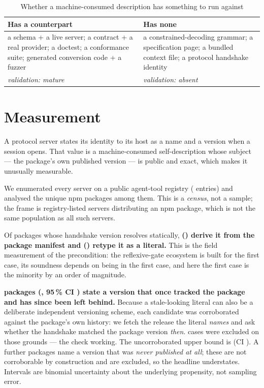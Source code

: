 \documentclass[10pt,conference]{IEEEtran}
\begin{document}
\begin{table}[t]
\caption{Whether a machine-consumed description has something to run against}
\label{tab:counterpart}
\centering\footnotesize
\begin{tabular}{@{}p{}p{}@{}}
\toprule
\textbf{Has a counterpart} & \textbf{Has none} \\
\midrule
a schema + a live server; a contract + a real provider; a doctest; a conformance suite;
generated conversion code + a fuzzer &
a constrained-decoding grammar; a specification page; a bundled context file; a protocol
handshake identity \\
\addlinespace
\emph{validation: mature} & \emph{validation: absent} \\
\bottomrule
\end{tabular}
\end{table}

\section{Measurement}

A protocol server states its identity to its host as a name and a version when a session
opens. That value is a machine-consumed self-description whose subject --- the package's
own published version --- is public and exact, which makes it unusually measurable.

We enumerated every server on a public agent-tool registry (\factEcoServers{} entries) and
analysed the \factEcoPackages{} unique npm packages among them. This is a \emph{census},
not a sample; the frame is registry-listed servers distributing an npm package, which is
not the same population as all such servers.

Of \factEcoApplicable{} packages whose handshake version resolves statically,
\textbf{\factEcoDerived{} (\factEcoDerivedPct{}) derive it from the package manifest and
\factEcoRetyped{} (\factEcoRetypedPct{}) retype it as a literal.} This is the field
measurement of the precondition: the reflexive-gate ecosystem is built for the first case,
its soundness depends on being in the first case, and here the first case is the minority
by an order of magnitude.

\textbf{\factEcoDriftConfirmed{} packages (\factEcoDriftConfirmedPct{}, 95\,\% CI
\factEcoDriftConfirmedCI{}) state a version that once tracked the package and has since
been left behind.} Because a stale-looking literal can also be a deliberate independent
versioning scheme, each candidate was corroborated against the package's own history: we
fetch the release the literal \emph{names} and ask whether the handshake matched the
package version \emph{then}. \factEcoIndependentVersioning{} cases were excluded on those
grounds --- the check working. The uncorroborated upper bound is
\factEcoDriftRawPct{} (CI \factEcoDriftRawCI{}). A further \factEcoNeverPublished{}
packages name a version that was \emph{never published at all}; these are not corroborable
by construction and are excluded, so the headline understates. Intervals are binomial
uncertainty about the underlying propensity, not sampling error.
\end{document}
